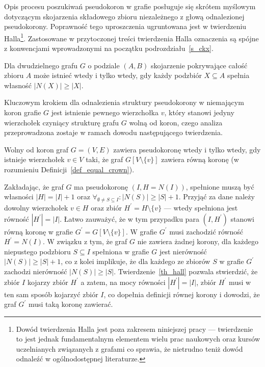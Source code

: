 \par{
  Opis procesu poszukiwań pseudokoron w grafie posługuje się skrótem myślowym dotyczącym skojarzenia składowego zbioru niezależnego z głową odnalezionej pseudokorony. 
  Poprawność tego uproszczenia ugruntowana jest w twierdzeniu Halla\footnote{Dowód twierdzenia Halla jest poza zakresem niniejszej pracy --- twierdzenie to jest jednak fundamentalnym elementem wielu prac naukowych oraz kursów uczelnianych związanych z grafami co sprawia, że nietrudno teniż dowód odnaleźć w ogólnodostępnej literaturze.}.
  Zastosowane w przytoczonej treści twierdzenia Halla oznaczenia są spójne z konwencjami wprowadzonymi na początku podrozdziału~\ref{s_ckx}.
  \begin{theorem}
    Dla dwudzielnego grafu $G$ o podziale $(A, B)$ skojarzenie pokrywające całość zbioru $A$ może istnieć wtedy i tylko wtedy, gdy każdy podzbiór $X \subseteq A$ spełnia własność $|N(X)| \geq |X|$.
  \end{theorem}
  Kluczowym krokiem dla odnalezienia struktury pseudokorony w niemającym koron grafie $G$ jest istnienie pewnego wierzchołka $v$, który stanowi jedyny wierzchołek czyniący strukturę grafu $G$ wolną od koron, czego analiza przeprowadzona zostaje w ramach dowodu następującego twierdzenia.
  \begin{theorem}
    Wolny od koron graf $G=(V, E)$ zawiera pseudokoronę wtedy i tylko wtedy, gdy istnieje wierzchołek $v \in V$ taki, że graf $G[V\setminus \{v\}]$ zawiera równą koronę (w rozumieniu Definicji~\ref{def_equal_crown}).
  \end{theorem}
  \begin{bproof}
    Zakładając, że graf $G$ ma pseudokoronę $(I, H=N(I))$, spełnione muszą być własności $|H| = |I| + 1$ oraz $\forall_{\emptyset\neq S \subseteq I}:{|N(S)|\geq|S|+1}$.
    Przyjąć za dane należy dowolny wierzchołek $v \in H$ oraz zbiór $H^\prime=H \setminus \{v\}$ --- wtedy spełniona jest równość $|H^\prime|=|I|$.
    Łatwo zauważyć, że w tym przypadku para $(I, H^\prime)$ stanowi równą koronę w grafie $G^\prime = G[V \setminus \{v\}]$.
    W grafie $G^\prime$ musi zachodzić równość $H^\prime = N(I)$.
    W związku z tym, że graf $G$ nie zawiera żadnej korony, dla każdego niepustego podzbioru $S \subseteq I$ spełniona w grafie $G$ jest nierówność $|N(S)| \geq |S|+1$, co z kolei implikuje, że dla każdego ze zbiorów $S$ w grafie $G^\prime$ zachodzi nierówność $|N(S)| \geq |S|$.
    Twierdzenie~\ref{th_hall} pozwala stwierdzić, że zbiór $I$ kojarzy zbiór $H^\prime$ a zatem, na mocy równości $|H^\prime|=|I|$, zbiór $H^\prime$ musi w ten sam sposób kojarzyć zbiór $I$, co dopełnia definicji równej korony i dowodzi, że graf $G^\prime$ musi taką koronę zawierać.


\end{bproof}}

